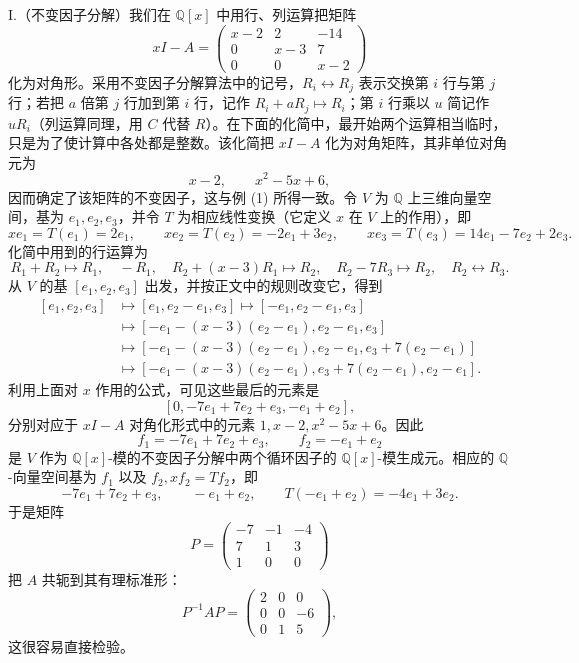 \begin{enumerate}[label=(\arabic*)]
\noindent I.（不变因子分解）我们在 $\mathbb Q[x]$ 中用行、列运算把矩阵
\[
xI-A=\begin{pmatrix}
x-2&2&-14\\
0&x-3&7\\
0&0&x-2
\end{pmatrix}
\]
化为对角形。采用不变因子分解算法中的记号，$R_i\leftrightarrow R_j$ 表示交换第 $i$ 行与第 $j$ 行；若把 $a$ 倍第 $j$ 行加到第 $i$ 行，记作 $R_i+aR_j\mapsto R_i$；第 $i$ 行乘以 $u$ 简记作 $uR_i$（列运算同理，用 $C$ 代替 $R$）。在下面的化简中，最开始两个运算相当临时，只是为了使计算中各处都是整数。该化简把 $xI-A$ 化为对角矩阵，其非单位对角元为
\[
x-2,\qquad x^2-5x+6,
\]
因而确定了该矩阵的不变因子，这与例 (1) 所得一致。令 $V$ 为 $\mathbb Q$ 上三维向量空间，基为 $e_1,e_2,e_3$，并令 $T$ 为相应线性变换（它定义 $x$ 在 $V$ 上的作用），即
\[
xe_1=T(e_1)=2e_1,
\qquad
xe_2=T(e_2)=-2e_1+3e_2,
\qquad
xe_3=T(e_3)=14e_1-7e_2+2e_3.
\]
化简中用到的行运算为
\[
R_1+R_2\mapsto R_1,
\quad -R_1,
\quad R_2+(x-3)R_1\mapsto R_2,
\quad R_2-7R_3\mapsto R_2,
\quad R_2\leftrightarrow R_3.
\]
从 $V$ 的基 $[e_1,e_2,e_3]$ 出发，并按正文中的规则改变它，得到
\[
\begin{aligned}
[e_1,e_2,e_3]
&\mapsto [e_1,e_2-e_1,e_3]
\mapsto [-e_1,e_2-e_1,e_3]\\
&\mapsto [-e_1-(x-3)(e_2-e_1),e_2-e_1,e_3]\\
&\mapsto [-e_1-(x-3)(e_2-e_1),e_2-e_1,e_3+7(e_2-e_1)]\\
&\mapsto [-e_1-(x-3)(e_2-e_1),e_3+7(e_2-e_1),e_2-e_1].
\end{aligned}
\]
利用上面对 $x$ 作用的公式，可见这些最后的元素是
\[
[0,-7e_1+7e_2+e_3,-e_1+e_2],
\]
分别对应于 $xI-A$ 对角化形式中的元素 $1,x-2,x^2-5x+6$。因此
\[
f_1=-7e_1+7e_2+e_3,
\qquad
f_2=-e_1+e_2
\]
是 $V$ 作为 $\mathbb Q[x]$-模的不变因子分解中两个循环因子的 $\mathbb Q[x]$-模生成元。相应的 $\mathbb Q$-向量空间基为 $f_1$ 以及 $f_2,xf_2=Tf_2$，即
\[
-7e_1+7e_2+e_3,
\qquad
-e_1+e_2,
\qquad
T(-e_1+e_2)=-4e_1+3e_2.
\]
于是矩阵
\[
P=\begin{pmatrix}
-7&-1&-4\\
7&1&3\\
1&0&0
\end{pmatrix}
\]
把 $A$ 共轭到其有理标准形：
\[
P^{-1}AP=\begin{pmatrix}2&0&0\\0&0&-6\\0&1&5\end{pmatrix},
\]
这很容易直接检验。


\end{enumerate}
